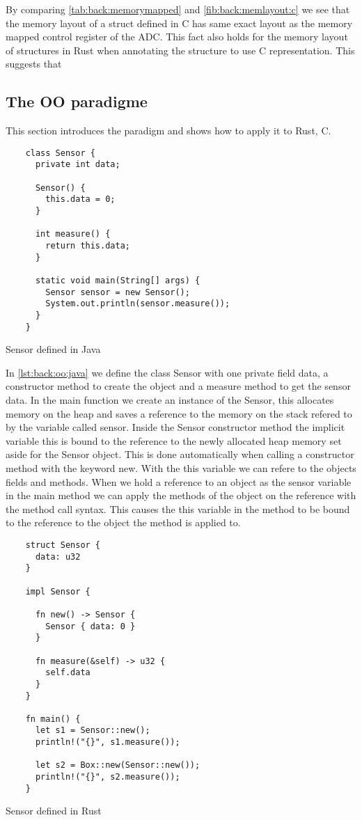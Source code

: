By comparing \autoref{tab:back:memorymapped} and \autoref{fib:back:memlayout:c} we see that the memory layout of a struct defined in C has same exact layout as the memory mapped control register of the ADC.
This fact also holds for the memory layout of structures in Rust when annotating the structure to use C representation.
This suggests that

\subsection{The OO paradigme}
This section introduces the paradigm and shows how to apply it to Rust, C.

\begin{listing}[H]
  \begin{verbatim}
    class Sensor {
      private int data;

      Sensor() {
        this.data = 0;
      }

      int measure() {
        return this.data;
      }

      static void main(String[] args) {
        Sensor sensor = new Sensor();
        System.out.println(sensor.measure());
      }
    }
  \end{verbatim}
  \caption{Sensor defined in Java}
  \label{lst:back:oo:java}
\end{listing}

In \autoref{lst:back:oo:java} we define the class Sensor with one private field data, a constructor method to create the object and a measure method to get the sensor data.
In the main function we create an instance of the Sensor, this allocates memory on the heap and saves a reference to the memory on the stack refered to by the  variable called sensor.
Inside the Sensor constructor method the implicit variable this is bound to the reference to the newly allocated heap memory set aside for the Sensor object.
This is done automatically when calling a constructor method with the keyword new.
With the this variable we can refere to the objects fields and methods.
When we hold a reference to an object as the sensor variable in the main method we can apply the methods of the object on the reference with the method call syntax.
This causes the this variable in the method to be bound to the reference to the object the method is applied to.

\begin{listing}[H]
  \begin{verbatim}
    struct Sensor {
      data: u32
    }

    impl Sensor {

      fn new() -> Sensor {
        Sensor { data: 0 }
      }

      fn measure(&self) -> u32 {
        self.data
      }
    }

    fn main() {
      let s1 = Sensor::new();
      println!("{}", s1.measure());

      let s2 = Box::new(Sensor::new());
      println!("{}", s2.measure());
    }
  \end{verbatim}
  \caption{Sensor defined in Rust}
  \label{lst:back:oo:rust}
\end{listing}

